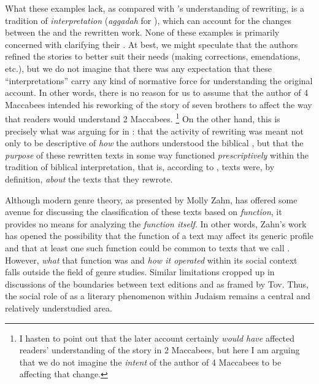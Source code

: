 What these examples lack, as compared with \vermes's understanding of rewriting, is a tradition of \emph{interpretation} (\emph{aggadah} for \vermes), which can account for the changes between the \vorlage and the rewritten work. None of these examples is primarily concerned with clarifying their \vorlage. At best, we might speculate that the authors refined the stories to better suit their needs (making corrections, emendations, etc.), but we do not imagine that there was any expectation that these ``interpretations'' carry any kind of normative force for understanding the original account. In other words, there is no reason for us to assume that the author of 4 Maccabees intended his reworking of the story of seven brothers to affect the way that readers would understand 2 Maccabees.%
    \footnote{%
        I hasten to point out that the later account certainly \emph{would have} affected readers' understanding of the story in 2 Maccabees, but here I am arguing that we do not imagine the \emph{intent} of the author of 4 Maccabees to be affecting that change.}
On the other hand, this is precisely what \vermes was arguing for in : that the activity of rewriting was meant not only to be descriptive of \emph{how} the authors understood the biblical \vorlagen, but that the \emph{purpose} of these rewritten texts in some way functioned \emph{prescriptively} within the tradition of biblical interpretation, that is, according to \vermes, \rwb texts were, by definition, \emph{about} the texts that they rewrote. 

Although modern genre theory, as presented by Molly Zahn, has offered some avenue for discussing the classification of these texts based on \emph{function}, it provides no means for analyzing the \emph{function itself}. In other words, Zahn's work has opened the possibility that the function of a text may affect its generic profile and that at least one such function could be common to texts that we call \rwb. However, \emph{what} that function was and \emph{how it operated} within its social context falls outside the field of genre studies. Similar limitations cropped up in discussions of the boundaries between text editions and \rwb as framed by Tov. Thus, the social role of \rwb as a literary phenomenon within \secondtemple Judaism remains a central and relatively understudied area.

